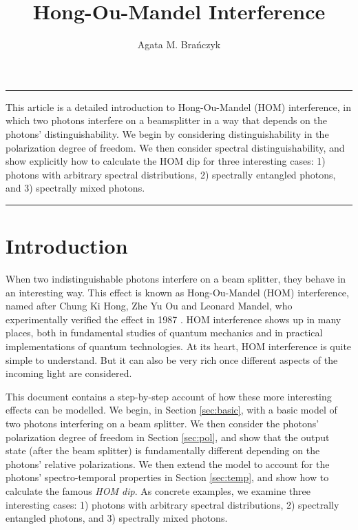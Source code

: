 \documentclass[12pt]{article}
\renewenvironment{abstract}{%
\hfill\begin{minipage}{0.95\textwidth}
\rule{\textwidth}{1pt}}
{\par\noindent\rule{\textwidth}{1pt}\end{minipage}}
\begin{document}
%
\title{\textbf{Hong-Ou-Mandel Interference}}
\author{Agata M. Bra\'nczyk}
%
\maketitle
%

\begin{abstract}
This article is a detailed introduction to Hong-Ou-Mandel (HOM) interference, in which two photons interfere on a beamsplitter in a way that depends on the photons' distinguishability. We begin by considering distinguishability in the polarization degree of freedom. We then consider spectral distinguishability, and show explicitly how to calculate the HOM dip for three interesting cases: 1)  photons with arbitrary spectral distributions, 2)  spectrally entangled  photons, and 3) spectrally mixed photons. 
\end{abstract}

\section{Introduction}
When two indistinguishable photons interfere on a beam splitter, they behave in an interesting way. This effect is known as Hong-Ou-Mandel (HOM) interference, named after Chung Ki Hong, Zhe Yu Ou and Leonard Mandel, who experimentally verified the effect in 1987 \cite{Hong1987}. HOM interference shows up in many places, both in fundamental studies of quantum mechanics and in practical implementations of quantum technologies. At its heart, HOM interference is quite simple to understand. But it can also be very rich once different aspects of the incoming light are considered. 

This document contains a step-by-step account of  how these more interesting effects can be modelled. We begin,  in Section \ref{sec:basic},  with a basic model of two photons interfering on a beam splitter. We then consider the photons' polarization degree of freedom in Section \ref{sec:pol},  and show that the output state (after the beam splitter) is fundamentally different depending on the photons' relative polarizations. We then extend the model to account for the photons' spectro-temporal properties in Section \ref{sec:temp}, and show how to calculate the famous \emph{HOM dip}. As concrete examples, we examine three interesting cases: 1)  photons with arbitrary spectral distributions, 2)  spectrally entangled  photons, and 3) spectrally mixed photons.  
\end{document}
